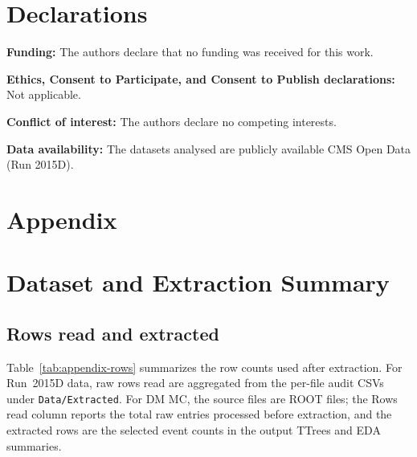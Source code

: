 \documentclass[11pt,a4paper,twocolumn]{article}
\begin{document}
\section*{Declarations}

\noindent\textbf{Funding:} The authors declare that no funding was received for this work.

\noindent\textbf{Ethics, Consent to Participate, and Consent to Publish declarations:} Not applicable.

\noindent\textbf{Conflict of interest:} The authors declare no competing interests.

\noindent\textbf{Data availability:} The datasets analysed are publicly available CMS Open Data (Run 2015D).

\clearpage
\onecolumn
\appendix

\section*{Appendix}

\section{Dataset and Extraction Summary}
\label{sec:appendix}

\subsection{Rows read and extracted}
\label{app:rows}

Table~\ref{tab:appendix-rows} summarizes the row counts used after extraction.
For Run~2015D data, raw rows read are aggregated from the per-file audit CSVs under
\texttt{Data/Extracted}. For DM MC, the source files are ROOT files; the
Rows read column reports the total raw entries processed before extraction, and
the extracted rows are the selected event counts in the output TTrees and EDA summaries.

\begin{table}[h]
\centering
\scriptsize
\caption{Dataset-level rows read and rows extracted for the analysis inputs.}
\label{tab:appendix-rows}
\end{table}
\end{document}
